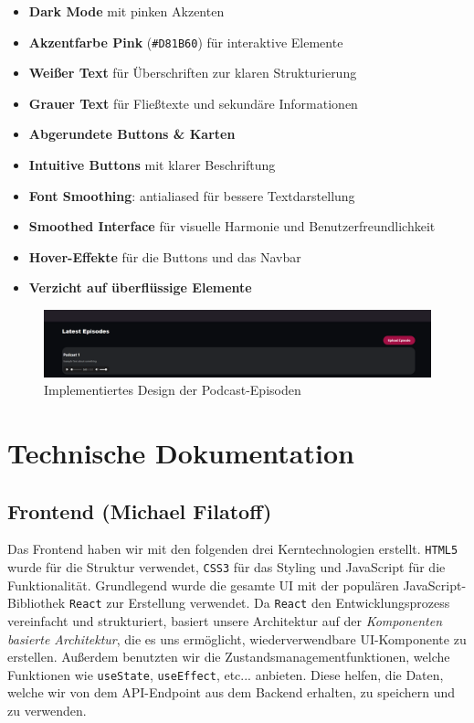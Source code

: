 \documentclass{article}
\begin{document}
\begin{itemize}
  \item \textbf{Dark Mode} mit pinken Akzenten
  \item \textbf{Akzentfarbe Pink} (\texttt{\#D81B60}) für interaktive Elemente
  \item \textbf{Weißer Text} für Überschriften zur klaren Strukturierung
  \item \textbf{Grauer Text} für Fließtexte und sekundäre Informationen
  \item \textbf{Abgerundete Buttons \& Karten}
  \item \textbf{Intuitive Buttons} mit klarer Beschriftung
  \item \textbf{Font Smoothing}: antialiased für bessere Textdarstellung
  \item \textbf{Smoothed Interface} für visuelle Harmonie und Benutzerfreundlichkeit
  \item \textbf{Hover-Effekte} für die Buttons und das Navbar
  \item \textbf{Verzicht auf überflüssige Elemente}
\end{itemize}

\begin{figure}[h]
  \caption{Implementiertes Design der Podcast-Episoden}
  \centering
  \includegraphics[width=\textwidth]{flosscaster4.png}
\end{figure}

\section{Technische Dokumentation}
\subsection{Frontend \small{(Michael Filatoff)}}
Das Frontend haben wir mit den folgenden drei Kerntechnologien erstellt. \texttt{HTML5} wurde für die Struktur verwendet, \texttt{CSS3} für das Styling und JavaScript für die Funktionalität. Grundlegend wurde die gesamte UI mit der populären JavaScript-Bibliothek \texttt{React} zur Erstellung verwendet. Da \texttt{React} den Entwicklungsprozess vereinfacht und strukturiert, basiert unsere Architektur auf der \textit{Komponenten basierte Architektur}, die es uns ermöglicht, wiederverwendbare UI-Komponente zu erstellen. Außerdem benutzten wir die Zustandsmanagementfunktionen, welche Funktionen wie \texttt{useState}, \texttt{useEffect}, etc... anbieten. Diese helfen, die Daten, welche wir von dem API-Endpoint aus dem Backend erhalten, zu speichern und zu verwenden.
\end{document}

